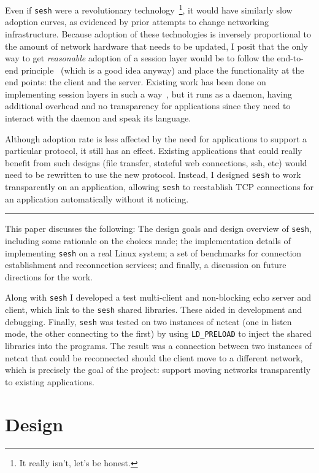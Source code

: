 \documentclass[twocolumn,10pt]{article}
\newcommand{\sesh}{\texttt{sesh}\xspace}
\begin{document}
Even if \sesh were a revolutionary technology~\footnote{It really isn't, let's
be honest.}, it would have similarly slow adoption curves, as evidenced by prior
attempts to change networking infrastructure. Because adoption of these
technologies is inversely proportional to the amount of network hardware that
needs to be updated, I posit that the only way to get \textit{reasonable}
adoption of a session layer would be to follow the end-to-end
principle~\cite{Saltzer} (which is a good idea anyway) and place the
functionality at the end points: the client and the server. Existing work has
been done on implementing session layers in such a way~\cite{wasptr-15-01}, but
it runs as a daemon, having additional overhead and no transparency for
applications since they need to interact with the daemon and speak its language.

Although adoption rate is less affected by the need for applications to support
a particular protocol, it still has an effect. Existing applications that could
really benefit from such designs (file transfer, stateful web connections, ssh,
etc) would need to be rewritten to use the new protocol. Instead, I designed
\sesh to work transparently on an application, allowing \sesh to
reestablish TCP connections for an application automatically without it noticing.

\begin{center}\rule{2cm}{0.1pt}\end{center}

This paper discusses the following: The design goals and design overview of
\sesh, including some rationale on the choices made; the implementation details
of implementing \sesh on a real Linux system; a set of benchmarks for connection
establishment and reconnection services; and finally, a discussion on future
directions for the work.

Along with \sesh I developed a test multi-client and non-blocking echo server
and client, which link to the \sesh shared libraries. These aided in development
and debugging. Finally, \sesh was tested on two instances of netcat (one in
listen mode, the other connecting to the first) by using \texttt{LD\_PRELOAD} to
inject the shared libraries into the programs. The result was a connection
between two instances of netcat that could be reconnected should the client move
to a different network, which is precisely the goal of the project: support
moving networks transparently to existing applications.

\section{Design}
\end{document}
